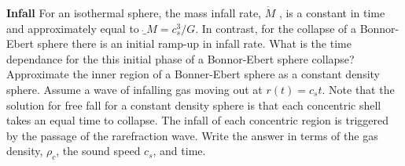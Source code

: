 \documentclass[twoside]{tufte-book} %
\begin{document}
\item \textbf{Infall}
     For an isothermal sphere, the mass infall rate, $\dot{M}$ , is a
    constant in time and approximately equal to $\dot_{M} = c^3_s/G$.
    In contrast, for the collapse of a Bonnor-Ebert sphere
there is an initial ramp-up in infall rate. What is the time dependance for the this initial
phase of a Bonnor-Ebert sphere collapse? Approximate the inner region of a Bonner-Ebert
sphere as a constant density sphere. Assume a wave of infalling gas moving out at $r(t) = c_s t$. Note
that the solution for free fall for a constant density sphere is that each concentric shell takes
an equal time to collapse. The infall of each concentric region is triggered by the passage of
the rarefraction wave. Write the answer in terms of the gas density, $\rho_c$, the sound speed $c_s$,
and time.
\end{document}
